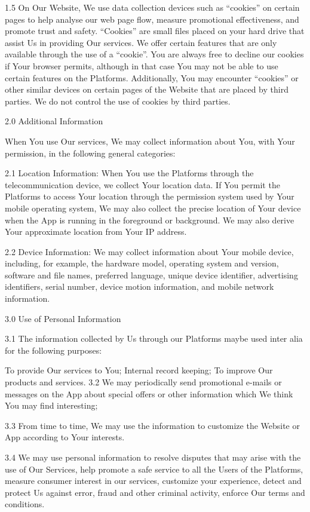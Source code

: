 1.5      On Our Website, We use data collection devices such as “cookies” on certain pages to help analyse our web page flow, measure promotional effectiveness, and promote trust and safety. “Cookies” are small files placed on your hard drive that assist Us in providing Our services. We offer certain features that are only available through the use of a “cookie”. You are always free to decline our cookies if Your browser permits, although in that case You may not be able to use certain features on the Platforms. Additionally, You may encounter “cookies” or other similar devices on certain pages of the Website that are placed by third parties. We do not control the use of cookies by third parties.

 

2.0     Additional Information

When You use Our services, We may collect information about You, with Your permission, in the following general categories:

2.1      Location Information: When You use the Platforms through the telecommunication device, we collect Your location data. If You permit the Platforms to access Your location through the permission system used by Your mobile operating system, We may also collect the precise location of Your device when the App is running in the foreground or background. We may also derive Your approximate location from Your IP address.

2.2      Device Information: We may collect information about Your mobile device, including, for example, the hardware model, operating system and version, software and file names, preferred language, unique device identifier, advertising identifiers, serial number, device motion information, and mobile network information.

 

3.0     Use of Personal Information

3.1      The information collected by Us through our Platforms maybe used inter alia for the following purposes:

To provide Our services to You;
Internal record keeping;
To improve Our products and services.
3.2      We may periodically send promotional e-mails or messages on the App about special offers or other information which We think You may find interesting;

3.3      From time to time, We may use the information to customize the Website or App according to Your interests.

3.4      We may use personal information to resolve disputes that may arise with the use of Our Services, help promote a safe service to all the Users of the Platforms, measure consumer interest in our services, customize your experience, detect and protect Us against error, fraud and other criminal activity, enforce Our terms and conditions.

